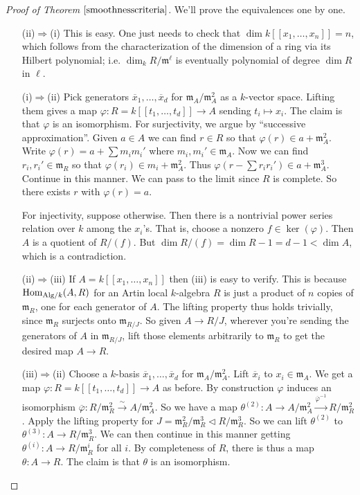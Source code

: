 \documentclass[10pt]{article}
\renewcommand{\phi}{\varphi}
\newcommand{\nsg}{\vartriangleleft}
\newcommand{\Hom}{\operatorname{Hom}}
\renewcommand{\(}{\left(}
\renewcommand{\)}{\right)}
\renewcommand{\bar}{\overline}
\newcommand{\m}{\backslash}
\renewcommand{\m}{\mathfrak{m}}
\numberwithin{thm}{subsection}
\begin{document}
\begin{proof}[Proof of Theorem $\ref{smoothnesscriteria}$]
We'll prove the equivalences one by one.
\begin{itemize}
\item[(ii)$\Rightarrow$(i)] This is easy. One just needs to check that
$\dim k[\![x_1,\ldots, x_n]\!]=n$, which follows from the 
characterization of the dimension of a ring via its Hilbert polynomial; i.e.
$\dim_k R/\m^\ell$ is eventually polynomial of degree $\dim R$ in $\ell$.\\

\item[(i)$\Rightarrow$(ii)] Pick generators $\bar x_1,\ldots, \bar x_d$ for
$\m_A/\m_A^2$ as a $k$-vector space. Lifting them gives a map
$\phi:R=k[\![t_1,\ldots, t_d]\!]\to A$
sending $t_i\mapsto x_i$.
The claim is that $\phi$ is an isomorphism.
For surjectivity, we argue by ``successive approximation''.
Given $a\in A$ we can find $r\in R$
so that $\phi(r)\in a+\m_A^2$.
Write $\phi(r)=a+\sum m_im_i'$ where $m_i,m_i'\in \m_A$.
Now we can find $r_i,r_i'\in \m_R$
so that $\phi(r_i)\in m_i+\m_A^2$.
Thus $\phi(r-\sum r_ir_i')\in a+\m_A^3$.
Continue in this manner. We can pass to the limit since $R$
is complete. So there exists $r$ with $\phi(r)=a$.

For injectivity, suppose otherwise. Then there is a nontrivial power series relation
over $k$ among the $x_i$'s. That is, choose a nonzero $f\in \ker(\phi)$.
Then $A$ is a quotient of $R/(f)$.
But $\dim R/(f)=\dim R - 1 = d - 1 < \dim A$, which is a contradiction.\\

\item[(ii)$\Rightarrow$(iii)] If $A=k[\![x_1,\ldots, x_n]\!]$
then (iii) is easy to verify. This is because $\Hom_{{\rm{Alg}}/k}(A,R)$
for an Artin local $k$-algebra $R$
is just a product of $n$ copies of $\m_R$, one for each generator of $A$.
The lifting property thus holds trivially, since $\m_R$ surjects
onto $\m_{R/J}$. So given $A\to R/J$, wherever you're sending the generators
of $A$ in $\m_{R/J}$, lift those elements arbitrarily to $\m_R$
to get the desired map $A\to R$.\\

\item[(iii)$\Rightarrow$(ii)]
Choose a $k$-basis $\bar x_1,\ldots, \bar x_d$ for $\m_A/\m_A^2$.
Lift $\bar x_i$ to $x_i\in \m_A$.
We get a map $\phi:R=k[\![t_1,\ldots, t_d]\!]\to A$
as before.
By construction $\phi$ induces an isomorphism $\bar\phi:R/\m_R^2\stackrel{\sim}{\to}A/\m_A^2$. 
So we have a map $\theta^{(2)}:A\to A/\m_A^2\stackrel{\bar\phi^{-1}}{\to}R/\m_R^2$.
Apply the lifting property
for $J=\m_R^2/\m_R^3\nsg R/\m_R^3$.
So we can lift $\theta^{(2)}$ to $\theta^{(3)}:A\to R/\m_R^3$.
We can then continue in this manner getting $\theta^{(i)}:A\to R/\m_R^i$
for all $i$.
By completeness of $R$, there is thus a map $\theta:A\to R$.
The claim is that $\theta$ is an isomorphism.


\end{itemize}
\end{proof}
\end{document}
